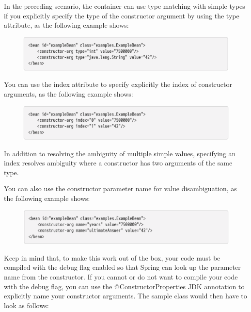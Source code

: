 In the preceding scenario, the container can use type matching with simple types if you explicitly
specify the type of the constructor argument by using the type attribute, as the following example
shows:

\begin{figure}[ht]
    \centering
    \includegraphics[width=1\linewidth]{./Figure/IMG_code_27.png}
\end{figure}
\newpage
You can use the index attribute to specify explicitly the index of constructor arguments, as the
following example shows:

\begin{figure}[ht]
    \centering
    \includegraphics[width=1\linewidth]{./Figure/IMG_code_28.png}
\end{figure}

In addition to resolving the ambiguity of multiple simple values, specifying an index resolves
ambiguity where a constructor has two arguments of the same type.

You can also use the constructor parameter name for value disambiguation, as the following
example shows:

\begin{figure}[ht]
    \centering
    \includegraphics[width=1\linewidth]{./Figure/IMG_code_29.png}
\end{figure}

\newpage
Keep in mind that, to make this work out of the box, your code must be compiled with the debug
flag enabled so that Spring can look up the parameter name from the constructor. If you cannot or
do not want to compile your code with the debug flag, you can use the @ConstructorProperties JDK
annotation to explicitly name your constructor arguments. The sample class would then have to
look as follows:

